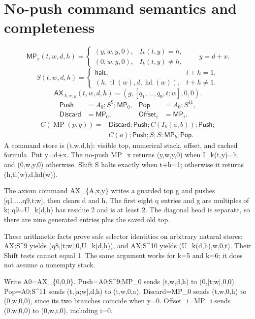 \documentclass[11pt,letterpaper]{article}
\begin{document}
\section{No-push command semantics and completeness}
\[
 \mathsf{MP}_x(t,w,d,h)=
 \begin{cases}
 (y,w,y,0),&I_k(t,y)=h,\\
 (0,w,y,0),&I_k(t,y)\ne h,
 \end{cases}\qquad y=d+x.
\]
\[
 S(t,w,d,h)=
 \begin{cases}
 \mathsf{halt},&t+h=1,\\
 (h,\operatorname{tl}(w),d,\operatorname{hd}(w)),&t+h\ne1.
 \end{cases}
\]
\[
 \mathsf{AX}_{A,x,y}(t,w,d,h)
 =(g,[q_1,\ldots,q_9,t;w],0,0).
\]
\begin{align*}
 \mathsf{Push}&=A_0;S^9;\mathsf{MP}_0,&
 \mathsf{Pop}&=A_0;S^{11},\\
 \mathsf{Discard}&=\mathsf{MP}_0,&
 \mathsf{Offset}_i&=\mathsf{MP}_i.
\end{align*}
\begin{align*}
 C(\operatorname{MP}(p,q))={}&
 \mathsf{Discard};\mathsf{Push};C(I_k(a,b));\mathsf{Push};\\
 &C(a);\mathsf{Push};S;S;\mathsf{MP}_b;\mathsf{Pop}.
\end{align*}
A command store is (t,w,d,h): visible top, numerical stack, offset, and cached formula. Put y=d+x. The no-push MP\_x returns (y,w,y,0) when I\_k(t,y)=h, and (0,w,y,0) otherwise. Shift S halts exactly when t+h=1; otherwise it returns (h,tl(w),d,hd(w)).

The axiom command AX\_\{A,x,y\} writes a guarded top g and pushes [q1,...,q9,t;w], then clears d and h. The first eight q entries and g are multiples of k; q9=U\_k(d,h) has residue 2 and is at least 2. The diagonal head is separate, so there are nine generated entries plus the saved old top.

These arithmetic facts prove safe selector identities on arbitrary natural stores: AX;S\textasciicircum{}9 yields (q8,[t;w],0,U\_k(d,h)), and AX;S\textasciicircum{}10 yields (U\_k(d,h),w,0,t). Their Shift tests cannot equal 1. The same argument works for k=5 and k=6; it does not assume a nonempty stack.

Write A0=AX\_\{0,0,0\}. Push=A0;S\textasciicircum{}9;MP\_0 sends (t,w,d,h) to (0,[t;w],0,0). Pop=A0;S\textasciicircum{}11 sends (t,[a;w],d,h) to (t,w,0,a). Discard=MP\_0 sends (t,w,0,h) to (0,w,0,0), since its two branches coincide when y=0. Offset\_i=MP\_i sends (0,w,0,0) to (0,w,i,0), including i=0.
\end{document}
